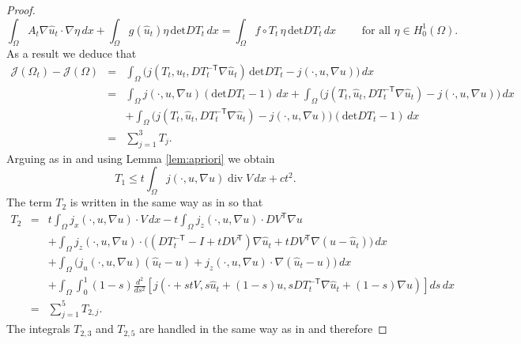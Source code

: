\documentclass[a4paper,10pt]{article}
\newcommand{\dx}{\,dx}
\theoremstyle{plain}
\theoremstyle{plain}
\numberwithin{equation}{section}
\DeclareMathOperator{\Div}{div}
\begin{document}
\begin{proof}
\begin{equation} \label{stateuht}
\int_{\Omega} A_t \nabla \hat u_t \cdot \nabla \eta  \dx + \int_{\Omega} g(\hat u_t) \eta \, \mbox{det} D T_t \dx = \int_{\Omega} f \circ T_t \, \eta \, \mbox{det} D T_t  \dx \qquad
\mbox{ for all } \eta \in H^1_0(\Omega).
\end{equation}
As a result we deduce that
\begin{eqnarray}
\mathcal J(\Omega_t) - \mathcal J(\Omega) 
& = & \int_{\Omega} \bigl( j(T_t,\hat u_t, D T_t^{- \mathsf{T}} \nabla \hat u_t) \, \mbox{det} DT_t - j(\cdot,u,\nabla u) \bigr)  \dx   \nonumber \\
& = & \int_{\Omega} j(\cdot,u,\nabla u) (\mbox{det} DT_t -1 )  \dx + \int_{\Omega} \bigl( j(T_t,\hat u_t,DT_t^{- \mathsf{T}} \nabla \hat u_t) - j(\cdot,u,\nabla u) \bigr)  \dx    \nonumber  \\
& & +  \int_{\Omega} \bigl( j(T_t,\hat u_t, DT_t^{- \mathsf{T}} \nabla \hat u_t) -j(\cdot,u,\nabla u) \bigr) ( \mbox{det} DT_t - 1)  \dx  \nonumber \\
& = &  \sum_{j=1}^3 T_j.  \label{difj}
\end{eqnarray}
Arguing as in \cite[(3.7)]{DHH25-convergence} and using Lemma \ref{lem:apriori} we obtain
\begin{equation} \label{eq:t1}
T_1   \leq t \int_{\Omega} j(\cdot,u,\nabla u) \Div V  \dx + c t^2.
\end{equation} 
The term $T_2$ is written in the same way as in \cite[(3.8)]{DHH25-convergence} so that
\begin{eqnarray}
T_2 & = & t  \int_{\Omega} j_x(\cdot,u,\nabla u) \cdot V  \dx - t \int_{\Omega} j_z(\cdot,u,\nabla u) \cdot DV^{\mathsf{T}} \nabla u \nonumber \\
& & + \int_{\Omega} j_z(\cdot,u,\nabla u) \cdot \bigl( (DT_t^{-\mathsf{T}} -I + t DV^{\mathsf{T}} ) \nabla \hat u_t + t DV^{\mathsf{T}} \nabla (u - \hat u_t) \bigr)  \dx \nonumber \\
& & +  \int_{\Omega} \bigl( j_u(\cdot,u,\nabla u)(\hat u_t -u)  + j_z(\cdot,u,\nabla u) \cdot \nabla (\hat u_t - u) \bigr)  \dx \nonumber \\
& & + \int_{\Omega}  \int_0^1 (1-s) \frac{d^2}{ds^2} \left[ j(\cdot +stV,s \hat u_t +(1-s) u,
s  DT_t^{-\mathsf{T}} \nabla \hat u_t +(1-s) \nabla u) \right] ds  \dx \nonumber \\
& = & \sum_{j=1}^5 T_{2,j}. \label{t2}
\end{eqnarray}
The integrals $T_{2,3}$ and $T_{2,5}$ are handled in the same way as in \cite[(3.9), (3.17)]{DHH25-convergence} and therefore

\end{proof}
\end{document}
